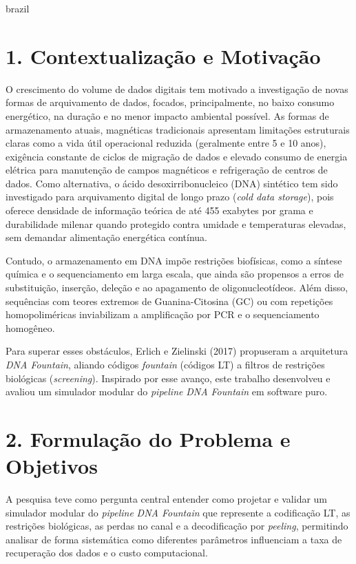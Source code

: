 \begin{resumo}
\begin{otherlanguage*}{brazil}

\section*{1. Contextualização e Motivação}

O crescimento do volume de dados digitais tem motivado a investigação de novas formas de arquivamento de dados, focados, principalmente, no baixo consumo energético, na duração e no menor impacto ambiental possível. As formas de armazenamento atuais, magnéticas tradicionais apresentam limitações estruturais claras como a vida útil operacional reduzida (geralmente entre 5 e 10 anos), exigência constante de ciclos de migração de dados e elevado consumo de energia elétrica para manutenção de campos magnéticos e refrigeração de centros de dados. Como alternativa, o ácido desoxirribonucleico (DNA) sintético tem sido investigado para arquivamento digital de longo prazo (\emph{cold data storage}), pois oferece densidade de informação teórica de até 455 exabytes por grama e durabilidade milenar quando protegido contra umidade e temperaturas elevadas, sem demandar alimentação energética contínua.

Contudo, o armazenamento em DNA impõe restrições biofísicas, como a síntese química e o sequenciamento em larga escala, que ainda são propensos a erros de substituição, inserção, deleção e ao apagamento de oligonucleotídeos. Além disso, sequências com teores extremos de Guanina-Citosina (GC) ou com repetições homopoliméricas inviabilizam a amplificação por PCR e o sequenciamento homogêneo.

Para superar esses obstáculos, Erlich e Zielinski (2017) propuseram a arquitetura \emph{DNA Fountain}, aliando códigos \emph{fountain} (códigos LT) a filtros de restrições biológicas (\emph{screening}). Inspirado por esse avanço, este trabalho desenvolveu e avaliou um simulador modular do \emph{pipeline} \emph{DNA Fountain} em software puro.

\section*{2. Formulação do Problema e Objetivos}

A pesquisa teve como pergunta central entender como projetar e validar um simulador modular do \emph{pipeline} \emph{DNA Fountain} que represente a codificação LT, as restrições biológicas, as perdas no canal e a decodificação por \emph{peeling}, permitindo analisar de forma sistemática como diferentes parâmetros influenciam a taxa de recuperação dos dados e o custo computacional.


\end{otherlanguage*}
\end{resumo}
